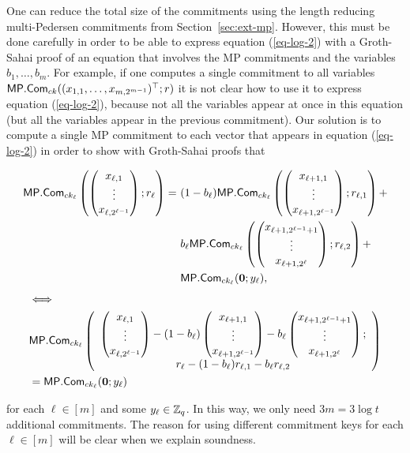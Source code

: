 One can reduce the total size of the commitments using the length reducing multi-Pedersen commitments from Section~\ref{sec:ext-mp}. However, this must be done carefully in order to be able to express equation (\ref{eq-log-2}) with a Groth-Sahai proof of an equation that involves the MP commitments and the variables $b_1,\ldots,b_m$. For example, if one computes a single commitment to all variables $\mathsf{MP}.\mathsf{Com}_{ck}((x_{1,1},\ldots,x_{m,2^{m-1}})^\top;r)$ it is not clear how to use it to express equation (\ref{eq-log-2}), because not all the variables appear at once in this equation (but all the variables appear in the previous commitment). Our solution is to compute a single MP commitment to each vector that appears in equation (\ref{eq-log-2}) in order to show with Groth-Sahai proofs that
\begin{small}
\begin{align*}
\MP.\Com_{ck_\ell}\left(
                    \pmatri{x_{\ell,1}\\\vdots\\x_{\ell,2^{\ell-1}}};r_\ell\right)
=\ &(1-b_\ell)\MP.\Com_{ck_\ell}\left(\pmatri{x_{\ell+1,1}\\\vdots\\x_{\ell+1,2^{\ell-1}}};r_{\ell,1}\right)+\\
& b_\ell\MP.\Com_{ck_\ell}\left(\pmatri{x_{\ell+1,2^{\ell-1}+1}\\\vdots\\x_{\ell+1,2^\ell}};r_{\ell,2}\right)+\\
& \MP.\Com_{ck_\ell}(\vecb{0};y_\ell),
\end{align*}
\begin{align*}
&\Longleftrightarrow\\
&\mathsf{MP}.\mathsf{Com}_{ck_\ell}\left(\begin{array}{c}
    \left(\begin{matrix}x_{\ell,1}\\\vdots\\x_{\ell,2^{\ell-1}}\end{matrix}\right)
    -(1-b_\ell)\left(\begin{matrix}x_{\ell+1,1}\\\vdots\\x_{\ell+1,2^{\ell-1}}\end{matrix}\right)
    -b_\ell\left(\begin{matrix}x_{\ell+1,2^{\ell-1}+1}\\\vdots\\x_{\ell+1,2^\ell}\end{matrix}\right);\\
    r_\ell-(1-b_\ell)r_{\ell,1}-b_\ell r_{\ell,2}
\end{array}\right)\\
&=
\mathsf{MP}.\mathsf{Com}_{ck_\ell}(\mathbf{0};y_\ell)
\end{align*}\end{small}
for each $\ell\in[m]$ and some $y_\ell\in\mathbb{Z}_q$. In this way, we only need $3m=3\log t$ additional commitments. The reason for using different commitment keys for each $\ell\in[m]$ will be clear when we explain soundness.

